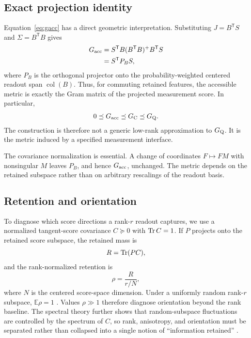 \subsection{Exact projection identity}
Equation~\eqref{eq:gacc} has a direct geometric interpretation. Substituting $J=B^{\mathsf T}S$ and $\Sigma=B^{\mathsf T}B$ gives
\begin{align}
 G_{\mathrm{acc}}
 &=S^{\mathsf T}B(B^{\mathsf T}B)^{+}B^{\mathsf T}S\\
 &=S^{\mathsf T}P_BS,
 \label{eq:projection_identity}
\end{align}
where $P_B$ is the orthogonal projector onto the probability-weighted centered readout span $\operatorname{col}(B)$. Thus, for commuting retained features, the accessible metric is exactly the Gram matrix of the projected measurement score. In particular,
\begin{equation}
 0\preceq G_{\mathrm{acc}}\preceq G_{\rm C}\preceq G_{\rm Q}.
\end{equation}
The construction is therefore not a generic low-rank approximation to $G_{\rm Q}$. It is the metric induced by a specified measurement interface.

The covariance normalization is essential. A change of coordinates $F\mapsto FM$ with nonsingular $M$ leaves $P_B$, and hence $G_{\mathrm{acc}}$, unchanged. The metric depends on the retained subspace rather than on arbitrary rescalings of the readout basis.

\subsection{Retention and orientation}
To diagnose which score directions a rank-$r$ readout captures, we use a normalized tangent-score covariance $C\succeq0$ with $\operatorname{Tr} C=1$. If $P$ projects onto the retained score subspace, the retained mass is
\begin{equation}
 R=\operatorname{Tr}(PC),
\end{equation}
and the rank-normalized retention is
\begin{equation}
 \rho=\frac{R}{r/N},
 \label{eq:rho}
\end{equation}
where $N$ is the centered score-space dimension. Under a uniformly random rank-$r$ subspace, $\mathbb E\rho=1$ \cite{AitHaddou2026ReadoutRank,AitHaddou2026SpectralGeometry}. Values $\rho\gg1$ therefore diagnose orientation beyond the rank baseline. The spectral theory further shows that random-subspace fluctuations are controlled by the spectrum of $C$, so rank, anisotropy, and orientation must be separated rather than collapsed into a single notion of ``information retained'' \cite{AitHaddou2026SpectralGeometry}.

